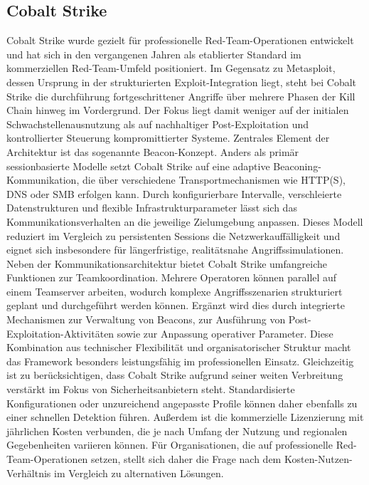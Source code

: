 \subsection{Cobalt Strike}
Cobalt Strike wurde gezielt für professionelle Red-Team-Operationen entwickelt und hat sich in den vergangenen Jahren als etablierter Standard im kommerziellen Red-Team-Umfeld positioniert. 
Im Gegensatz zu Metasploit, dessen Ursprung in der strukturierten Exploit-Integration liegt, steht bei Cobalt Strike die durchführung fortgeschrittener Angriffe über mehrere Phasen der Kill Chain hinweg im Vordergrund. 
Der Fokus liegt damit weniger auf der initialen Schwachstellenausnutzung als auf nachhaltiger Post-Exploitation und kontrollierter Steuerung kompromittierter Systeme.
\newline\newline
Zentrales Element der Architektur ist das sogenannte Beacon-Konzept. Anders als primär sessionbasierte Modelle setzt Cobalt Strike auf eine adaptive Beaconing-Kommunikation, die über verschiedene Transportmechanismen wie HTTP(S), DNS oder SMB erfolgen kann. Durch konfigurierbare Intervalle, verschleierte Datenstrukturen und flexible Infrastrukturparameter lässt sich das Kommunikationsverhalten an die jeweilige Zielumgebung anpassen. 
Dieses Modell reduziert im Vergleich zu persistenten Sessions die Netzwerkauffälligkeit und eignet sich insbesondere für längerfristige, realitätsnahe Angriffssimulationen.
\newline\newline
Neben der Kommunikationsarchitektur bietet Cobalt Strike umfangreiche Funktionen zur Teamkoordination. Mehrere Operatoren können parallel auf einem Teamserver arbeiten, wodurch komplexe Angriffsszenarien strukturiert geplant und durchgeführt werden können. Ergänzt wird dies durch integrierte Mechanismen zur Verwaltung von Beacons, zur Ausführung von Post-Exploitation-Aktivitäten sowie zur Anpassung operativer Parameter. 
Diese Kombination aus technischer Flexibilität und organisatorischer Struktur macht das Framework besonders leistungsfähig im professionellen Einsatz.
\newline\newline
Gleichzeitig ist zu berücksichtigen, dass Cobalt Strike aufgrund seiner weiten Verbreitung verstärkt im Fokus von Sicherheitsanbietern steht. Standardisierte Konfigurationen oder unzureichend angepasste Profile können daher ebenfalls zu einer schnellen Detektion führen. Außerdem ist die kommerzielle Lizenzierung mit jährlichen Kosten verbunden, die je nach Umfang der Nutzung und regionalen Gegebenheiten variieren können. 
Für Organisationen, die auf professionelle Red-Team-Operationen setzen, stellt sich daher die Frage nach dem Kosten-Nutzen-Verhältnis im Vergleich zu alternativen Lösungen.
